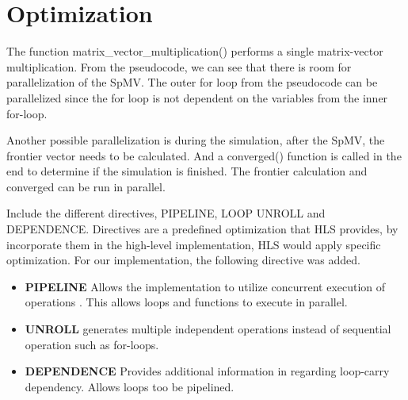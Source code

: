\section{Optimization}
The function matrix\_vector\_multiplication() performs a single matrix-vector multiplication. From the pseudocode, we can see that there is room for parallelization of the SpMV. The outer for loop from the pseudocode can be parallelized since the for loop is not dependent on the variables from the inner for-loop. 

Another possible parallelization is during the simulation, after the SpMV, the frontier vector needs to be calculated. And a converged() function is called in the end to determine if the simulation is finished. The frontier calculation and converged can be run in parallel. 

Include the different directives, PIPELINE, LOOP UNROLL and DEPENDENCE. Directives are a predefined optimization that HLS provides, by incorporate them in the high-level implementation, HLS would apply specific optimization. For our implementation, the following directive was added.

\begin{itemize}
\item \textbf{PIPELINE} Allows the implementation to utilize concurrent execution of operations \citep{optiDirect}. This allows loops and functions to execute in parallel. 
\item \textbf{UNROLL} generates multiple independent operations instead of sequential operation such as for-loops.\citep{optiDirect}
\item \textbf{DEPENDENCE} Provides additional information in regarding loop-carry dependency. Allows loops too be pipelined.\citep{optiDirect}
\end{itemize}

